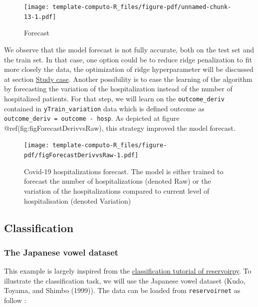 \documentclass[
  11pt,
  a4paper,
]{article}
\theoremstyle{plain}
\theoremstyle{remark}
\begin{document}
\begin{figure}[H]

{\centering \texttt{[image: template-computo-R\_files/figure-pdf/unnamed-chunk-13-1.pdf]}

}

\caption{Forecast}

\end{figure}%

We observe that the model forecast is not fully accurate, both on the
test set and the train set. In that case, one option could be to reduce
ridge penalization to fit more closely the data, the optimization of
ridge hyperparameter will be discussed at section
\hyperref[studycase]{Study case}. Another possibility is to ease the
learning of the algorithm by forecasting the variation of the
hospitalization instead of the number of hospitalized patients. For that
step, we will learn on the \texttt{outcome\_deriv} contained in
\texttt{yTrain\_variation} data which is defined outcome as
\texttt{outcome\_deriv\ =\ outcome\ -\ hosp}. As depicted at figure
@ref(fig:figForecastDerivvsRaw), this strategy improved the model
forecast.

\begin{figure}[H]

{\centering \texttt{[image: template-computo-R\_files/figure-pdf/figForecastDerivvsRaw-1.pdf]}

}

\caption{Covid-19 hospitalizations forecast. The model is either trained
to forecast the number of hospitalizations (denoted Raw) or the
variation of the hospitalizations compared to current level of
hospitalisation (denoted Variation)}

\end{figure}%

\subsection{Classification}\label{classification}

\subsubsection{The Japanese vowel
dataset}\label{the-japanese-vowel-dataset}

This example is largely inspired from the
\href{https://github.com/reservoirpy/reservoirpy/blob/master/tutorials/5-Classification-with-RC.ipynb}{classification
tutorial of reservoirpy}. To illustrate the classification task, we will
use the Japanese vowel dataset (Kudo, Toyama, and Shimbo (1999)). The
data can be loaded from \texttt{reservoirnet} as follow :
\end{document}
